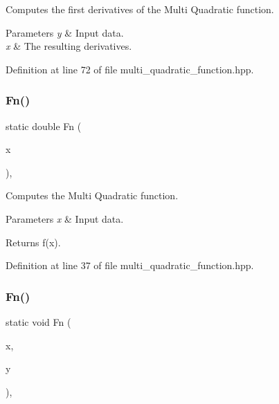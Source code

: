Computes the first derivatives of the Multi Quadratic function. 


\begin{DoxyParams}{Parameters}
{\em y} & Input data. \\
\hline
{\em x} & The resulting derivatives. \\
\hline
\end{DoxyParams}


Definition at line 72 of file multi\+\_\+quadratic\+\_\+function.\+hpp.

\mbox{\label{classmlpack_1_1ann_1_1MultiQuadFunction_a11bd9a1195e6b107f9fee73643bc328b}} 
\subsubsection{Fn()\hspace{0.1cm}{\footnotesize\ttfamily [1/2]}}
{\footnotesize\ttfamily static double Fn (\begin{DoxyParamCaption}\item[{const double}]{x }\end{DoxyParamCaption})\hspace{0.3cm}{\ttfamily [inline]}, {\ttfamily [static]}}



Computes the Multi Quadratic function. 


\begin{DoxyParams}{Parameters}
{\em x} & Input data. \\
\hline
\end{DoxyParams}
\begin{DoxyReturn}{Returns}
f(x). 
\end{DoxyReturn}


Definition at line 37 of file multi\+\_\+quadratic\+\_\+function.\+hpp.

\mbox{\label{classmlpack_1_1ann_1_1MultiQuadFunction_af6cf5da90eb6312e3e25c9b8bd9c3527}} 
\subsubsection{Fn()\hspace{0.1cm}{\footnotesize\ttfamily [2/2]}}
{\footnotesize\ttfamily static void Fn (\begin{DoxyParamCaption}\item[{const Input\+Vec\+Type \&}]{x,  }\item[{Output\+Vec\+Type \&}]{y }\end{DoxyParamCaption})\hspace{0.3cm}{\ttfamily [inline]}, {\ttfamily [static]}}



